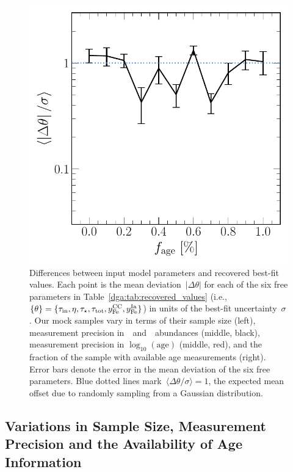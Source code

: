 \begin{figure}
\includegraphics[scale = 0.42]{dp_sigma_agefrac.pdf}
\caption{
Differences between input model parameters and recovered best-fit values.
Each point is the mean deviation~$\left|\Delta\theta\right|$ for each of the
six free parameters in Table~\ref{dga:tab:recovered_values} (i.e.,
$\{\theta\} = \{\tau_\text{in}, \eta, \tau_\star, \tau_\text{tot}, y_\text{Fe}^\text{CC},
y_\text{Fe}^\text{Ia}\}$) in units of the best-fit uncertainty~$\sigma$.
Our mock samples vary in terms of their sample size (left), measurement
precision in~\feh~and~\afe~abundances (middle, black), measurement precision in
$\log_{10}(\text{age})$ (middle, red), and the fraction of the sample with
available age measurements (right).
Error bars denote the error in the mean deviation of the six free parameters.
Blue dotted lines mark~$\langle \Delta \theta / \sigma \rangle = 1$, the
expected mean offset due to randomly sampling from a Gaussian distribution.
}
\label{dga:fig:accuracy}
\end{figure}

\subsection{Variations in Sample Size, Measurement Precision and the
Availability of Age Information}
\label{dga:sec:mocks:variations}

